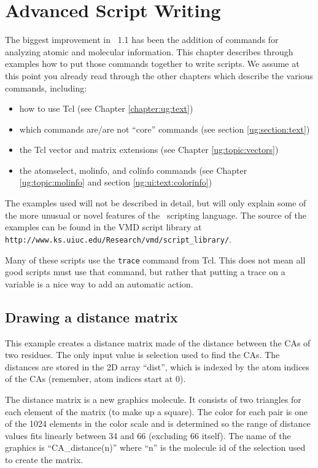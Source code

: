 \chapter{Advanced Script Writing}
\label{ug:topic:script:writing}

The biggest improvement in \VMD\ 1.1 has been the addition of  
commands for analyzing atomic and molecular information.  This 
chapter describes through examples how to put those commands 
together to write scripts.  We assume at this point you 
already read through the other chapters which describe the various 
commands, including:
\begin{itemize}
  \item	how to use Tcl 
(see Chapter \ref{chapter:ug:text})
  \item	which commands are/are not ``core'' commands 
(see section \ref{ug:section:text})
  \item	the Tcl vector and matrix extensions 
(see Chapter \ref{ug:topic:vectors})
  \item the atomselect, molinfo, and colinfo commands 
(see Chapter \ref{ug:topic:molinfo} and 
section \ref{ug:ui:text:colorinfo})
\end{itemize}

The examples used will not be described in detail, but will only 
explain some of the more unusual or novel features of the \VMD\ 
scripting language.  The source of the examples can be found
in the VMD script library at
\verb!http://www.ks.uiuc.edu/Research/vmd/script_library/!.

Many of these scripts use the {\tt trace} command from Tcl.
This does not mean all good scripts must use that command,
but rather that putting a trace on a variable is a nice way
to add an automatic action.

\section{Drawing a distance matrix}

	This example creates a distance matrix made of the distance
between the CAs of two residues.  The only input value is selection
used to find the CAs.  The distances are stored in the 2D array
``dist'', which is indexed by the atom indices of the CAs (remember,
atom indices start at 0).

	The distance matrix is a new graphics molecule.  It consists
of two triangles for each element of the matrix (to make up a square).
The color for each pair is one of the 1024 elements in the color scale
and is determined so the range of distance values fits linearly
between 34 and 66 (excluding 66 itself).  The name of the graphics is
``CA\_distance(n)'' where ``n'' is the molecule id of the selection
used to create the matrix.

